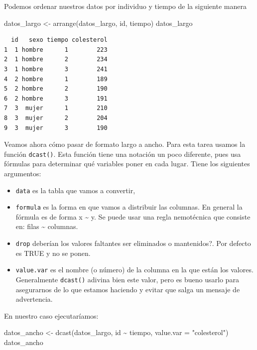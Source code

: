 \documentclass[
]{book}
\newenvironment{Shaded}{\begin{snugshade}}{\end{snugshade}}
\newcommand{\AttributeTok}[1]{\textcolor[rgb]{0.77,0.63,0.00}{#1}}
\newcommand{\FunctionTok}[1]{\textcolor[rgb]{0.00,0.00,0.00}{#1}}
\newcommand{\NormalTok}[1]{#1}
\newcommand{\OtherTok}[1]{\textcolor[rgb]{0.56,0.35,0.01}{#1}}
\newcommand{\SpecialCharTok}[1]{\textcolor[rgb]{0.00,0.00,0.00}{#1}}
\newcommand{\StringTok}[1]{\textcolor[rgb]{0.31,0.60,0.02}{#1}}
\providecommand{\tightlist}{%
  \setlength{\itemsep}{0pt}\setlength{\parskip}{0pt}}
\begin{document}
Podemos ordenar nuestros datos por individuo y tiempo de la siguiente manera

\begin{Shaded}
\begin{Highlighting}[]
\NormalTok{datos\_largo }\OtherTok{\textless{}{-}} \FunctionTok{arrange}\NormalTok{(datos\_largo, id, tiempo)}
\NormalTok{datos\_largo}
\end{Highlighting}
\end{Shaded}

\begin{verbatim}
  id   sexo tiempo colesterol
1  1 hombre      1        223
2  1 hombre      2        234
3  1 hombre      3        241
4  2 hombre      1        189
5  2 hombre      2        190
6  2 hombre      3        191
7  3  mujer      1        210
8  3  mujer      2        204
9  3  mujer      3        190
\end{verbatim}

Veamos ahora cómo pasar de formato largo a ancho. Para esta tarea usamos la función \texttt{dcast()}. Esta función tiene una notación un poco diferente, pues usa fórmulas para determinar qué variables poner en cada lugar. Tiene los siguientes argumentos:

\begin{itemize}
\tightlist
\item
  \texttt{data} es la tabla que vamos a convertir,
\item
  \texttt{formula} es la forma en que vamos a distribuir las columnas. En general la fórmula es de forma x \textasciitilde{} y. Se puede usar una regla nemotécnica que consiste en: filas \textasciitilde{} columnas.
\item
  \texttt{drop} deberían los valores faltantes ser eliminados o mantenidos?. Por defecto es TRUE y no se ponen.
\item
  \texttt{value.var} es el nombre (o número) de la columna en la que están los valores. Generalmente \texttt{dcast()} adivina bien este valor, pero es bueno usarlo para asegurarnos de lo que estamos haciendo y evitar que salga un mensaje de advertencia.
\end{itemize}

En nuestro caso ejecutaríamos:

\begin{Shaded}
\begin{Highlighting}[]
\NormalTok{datos\_ancho }\OtherTok{\textless{}{-}} \FunctionTok{dcast}\NormalTok{(datos\_largo, id }\SpecialCharTok{\textasciitilde{}}\NormalTok{ tiempo,}
                     \AttributeTok{value.var =} \StringTok{"colesterol"}\NormalTok{)}
\NormalTok{datos\_ancho}
\end{Highlighting}
\end{Shaded}
\end{document}
